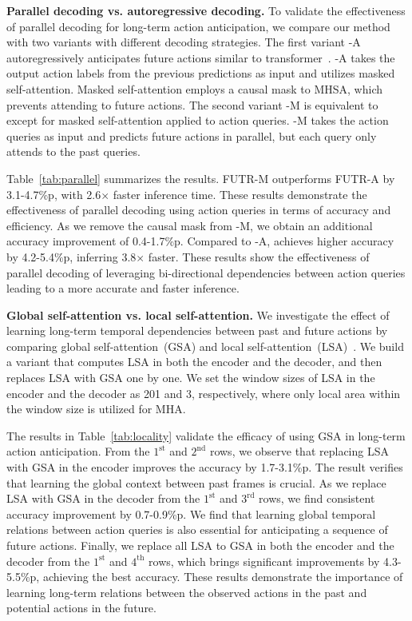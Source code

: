 

\vspace{1mm}

\noindent
\textbf{Parallel decoding vs. autoregressive decoding.}
To validate the effectiveness of parallel decoding for long-term action anticipation, we compare our method with two \ours variants with different decoding strategies.
The first variant \ours-A autoregressively anticipates future actions similar to transformer~\cite{vaswani2017attention}. \ours-A takes the output action labels from the previous predictions as input and utilizes masked self-attention. Masked self-attention employs a causal mask to MHSA, which prevents attending to future actions.
The second variant \ours-M is equivalent to \ours except for masked self-attention applied to action queries. \ours-M takes the action queries as input and predicts future actions in parallel, but each query only attends to the past queries.

Table~\ref{tab:parallel} summarizes the results.
FUTR-M outperforms FUTR-A by 3.1-4.7\%p, with 2.6$\times$ faster inference time.
These results demonstrate the effectiveness of parallel decoding using action queries in terms of accuracy and efficiency.
As we remove the causal mask from \ours-M, we obtain an additional accuracy improvement of 0.4-1.7\%p.
Compared to \ours-A, \ours achieves higher accuracy by 4.2-5.4\%p, inferring 3.8$\times$ faster.
These results show the effectiveness of parallel decoding of leveraging bi-directional dependencies between action queries leading to a more accurate and faster inference.


\vspace{1mm}
\noindent
\textbf{Global self-attention vs. local self-attention.}
We investigate the effect of learning long-term temporal dependencies between past and future actions by comparing global self-attention~(GSA) and local self-attention~(LSA)~\cite{ramachandran2019stand}.
We build a \ours variant that computes LSA in both the encoder and the decoder, and then replaces LSA with GSA one by one.
We set the window sizes of LSA in the encoder and the decoder as 201 and 3, respectively, where only local area within the window size is utilized for MHA.

The results in Table~\ref{tab:locality} validate the efficacy of using GSA in long-term action anticipation.
From the $1^{\textrm{st}}$ and $2^{\textrm{nd}}$ rows, we observe that replacing LSA with GSA in the encoder improves the accuracy by 1.7-3.1\%p. 
The result verifies that learning the global context between past frames is crucial.
As we replace LSA with GSA in the decoder from the $1^{\textrm{st}}$ and $3^{\textrm{rd}}$ rows, we find consistent accuracy improvement by 0.7-0.9\%p.
We find that learning global temporal relations between action queries is also essential for anticipating a sequence of future actions.
Finally, we replace all LSA to GSA in both the encoder and the decoder from the $1^{\textrm{st}}$ and $4^{\textrm{th}}$ rows, which brings significant improvements by 4.3-5.5\%p, achieving the best accuracy.
These results demonstrate the importance of learning long-term relations between the observed actions in the past and potential actions in the future.

